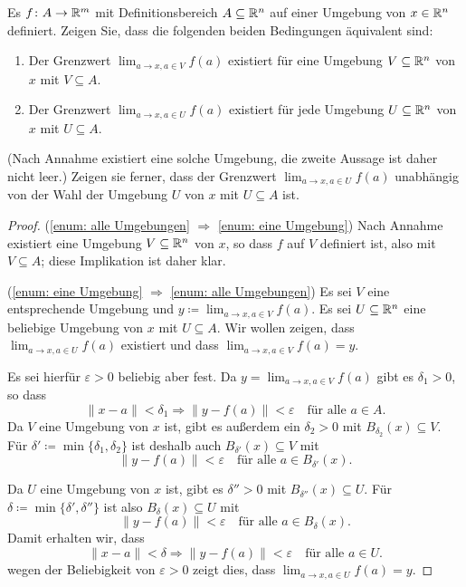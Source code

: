 \documentclass[a4paper,10pt]{article}
\begin{document}
\begin{lem}\label{lem: Unabhängigkeit von Umgebung}
 Es $f \colon A \to \mathbb{R}^m$ mit Definitionsbereich $A \subseteq \mathbb{R}^n$ auf einer Umgebung von $x \in \mathbb{R}^n$ definiert. Zeigen Sie, dass die folgenden beiden Bedingungen äquivalent sind:
 \begin{enumerate}
  \item\label{enum: eine Umgebung}
   Der Grenzwert $\lim_{a \to x, a \in V} f(a)$ existiert für eine Umgebung $V \subseteq \mathbb{R}^n$ von $x$ mit $V \subseteq A$.
  \item\label{enum: alle Umgebungen}
   Der Grenzwert $\lim_{a \to x, a \in U} f(a)$ existiert für jede Umgebung $U \subseteq \mathbb{R}^n$ von $x$ mit $U \subseteq A$.
 \end{enumerate}
 (Nach Annahme existiert eine solche Umgebung, die zweite Aussage ist daher nicht leer.)
 Zeigen sie ferner, dass der Grenzwert $\lim_{a \to x, a \in U} f(a)$ unabhängig von der Wahl der Umgebung $U$ von $x$ mit $U \subseteq A$ ist.
\end{lem}
\begin{proof} 
 (\ref{enum: alle Umgebungen} $\Rightarrow$ \ref{enum: eine Umgebung}) Nach Annahme existiert eine Umgebung $V \subseteq \mathbb{R}^n$ von $x$, so dass $f$ auf $V$ definiert ist, also mit $V \subseteq A$; diese Implikation ist daher klar.
 
 (\ref{enum: eine Umgebung} $\Rightarrow$ \ref{enum: alle Umgebungen}) Es sei $V$ eine entsprechende Umgebung und $y \coloneqq \lim_{a \to x, a \in V} f(a)$. Es sei $U \subseteq \mathbb{R}^n$ eine beliebige Umgebung von $x$ mit $U \subseteq A$. Wir wollen zeigen, dass $\lim_{a \to x, a \in U} f(a)$ existiert und dass $\lim_{a \to x, a \in V} f(a) = y$.
 
 Es sei hierfür $\varepsilon > 0$ beliebig aber fest. Da $y = \lim_{a \to x, a \in V} f(a)$ gibt es $\delta_1 > 0$, so dass
 \[
  \|x-a\| < \delta_1 \Rightarrow \|y-f(a)\| < \varepsilon
  \quad \text{für alle $a \in A$}.
 \]
 Da $V$ eine Umgebung von $x$ ist, gibt es außerdem ein $\delta_2 > 0$ mit $B_{\delta_2}(x) \subseteq V$. Für $\delta' \coloneqq \min\{\delta_1, \delta_2\}$ ist deshalb auch $B_{\delta'}(x) \subseteq V$ mit
 \[
  \|y-f(a)\| < \varepsilon \quad \text{für alle $a \in B_{\delta'}(x)$}.
 \]
 
 Da $U$ eine Umgebung von $x$ ist, gibt es $\delta'' > 0$ mit $B_{\delta''}(x) \subseteq U$. Für $\delta \coloneqq \min\{\delta', \delta''\}$ ist also $B_\delta(x) \subseteq U$ mit
 \[
  \|y-f(a)\| < \varepsilon \quad \text{für alle $a \in B_\delta(x)$}.
 \]
 Damit erhalten wir, dass
 \[
  \|x-a\| < \delta \Rightarrow \|y-f(a)\| < \varepsilon \quad \text{für alle $a \in U$}.
 \]
 wegen der Beliebigkeit von $\varepsilon > 0$ zeigt dies, dass $\lim_{a \to x, a \in U} f(a) = y$.
\end{proof}
\end{document}
